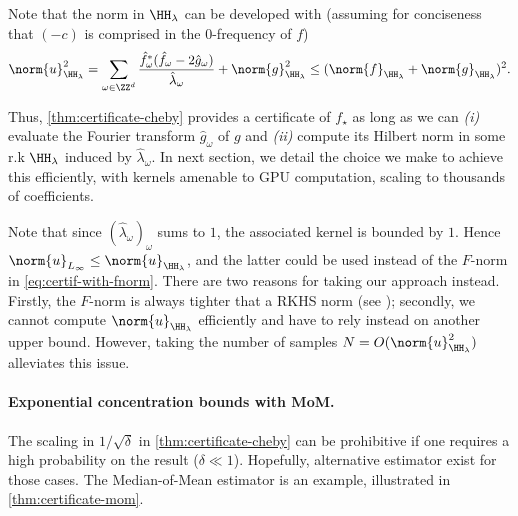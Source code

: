 \documentclass{article}
\begin{document}
Note that the norm in $\HH_\lambda$ can be developed with (assuming for conciseness that $(-c)$ is comprised in the $0$-frequency of $f$)
\begin{equation}
  \norm{u}_{\HH_\lambda}^2 = \sum_{\omega \in \ZZ^d} \frac{\hat{f}_\omega^* (\hat{f}_\omega - 2\hat{g}_\omega)}{\hat{\lambda}_\omega} + \norm{g}_{\HH_\lambda}^2 \leq (\norm{f}_{\HH_\lambda} + \norm{g}_{\HH_\lambda})^2.
\end{equation}

Thus, \cref{thm:certificate-cheby} provides a certificate of $f_\star$ as long as we can \emph{(i)} evaluate the Fourier transform $\hat{g}_\omega$ of $g$ and \emph{(ii)} compute its Hilbert norm in some r.k $\HH_\lambda$ induced by $\hat{\lambda}_\omega$. In next section, we detail the choice we make to achieve this efficiently, with kernels amenable to GPU computation, scaling to thousands of coefficients.

\begin{remark}
  Note that since $(\hat{\lambda}_\omega)_\omega$ sums to $1$, the associated kernel is bounded by $1$. Hence $\norm{u}_{L_\infty} \leq \norm{u}_{\HH_\lambda}$, and the latter could be used instead of the $F$-norm in \cref{eq:certif-with-fnorm}. There are two reasons for taking our approach instead. Firstly, the $F$-norm is always tighter that a RKHS norm (see \eg \cite[Lem. 4]{woodworthNonConvexOptimizationCertificates2022}); secondly, we cannot compute $\norm{u}_{\HH_\lambda}$ efficiently and have to rely instead on another upper bound. However, taking the number of samples $N = O(\norm{u}_{\HH_\lambda}^2)$ alleviates this issue.
\end{remark}

\paragraph{Exponential concentration bounds with MoM.}
The scaling in $1/\sqrt{\delta}$ in \cref{thm:certificate-cheby} can be prohibitive if one requires a high probability on the result ($\delta \ll 1$). Hopefully, alternative estimator exist for those cases. The Median-of-Mean estimator is an example, illustrated in \cref{thm:certificate-mom}.
\end{document}
